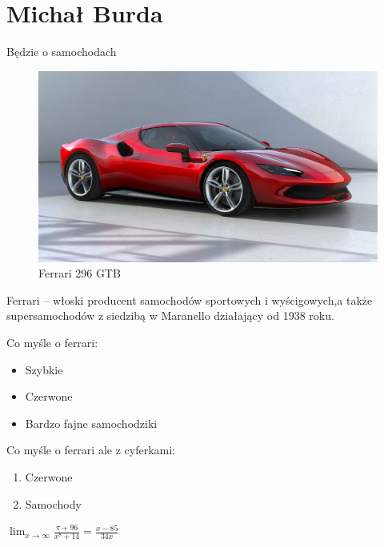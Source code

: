\section{Michał Burda}
\label{sec:burdamichal}
\noindent Będzie o samochodach
\begin{figure}[htbp]
    \centering
    \includegraphics[width=1\textwidth]{pictures/ferrari.jpg}
    \caption{Ferrari 296 GTB}
    \label{fig:ferrari}
\end{figure}

\noindent  Ferrari – włoski producent samochodów sportowych i wyścigowych,a także  supersamochodów z siedzibą w Maranello działający od 1938 roku. 
 


\noindent Co myśle o ferrari:
\begin{itemize}
  \item Szybkie
  \item Czerwone
  \item Bardzo fajne samochodziki
\end{itemize}
\noindent Co myśle o ferrari ale z cyferkami:
\begin{enumerate}
  \item Czerwone
  \item Samochody
\end{enumerate}



$\lim_{x \to \infty}
\frac{\pi+96}{x^8+14}
= \frac{x-85}{34x}$

